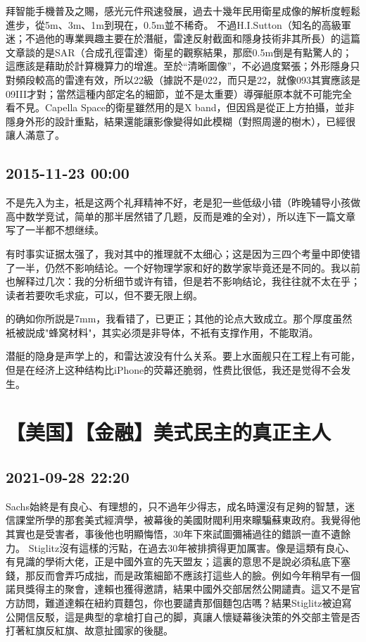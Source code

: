 \documentclass[twocolumn]{ctexart}
\begin{document}
拜智能手機普及之賜，感光元件飛速發展，過去十幾年民用衛星成像的解析度輕鬆進步，從5m、3m、1m到現在，0.5m並不稀奇。
不過H.I.Sutton（知名的高級軍迷；不過他的專業興趣主要在於潛艇，雷達反射截面和隱身技術非其所長）的這篇文章談的是SAR（合成孔徑雷達）衛星的觀察結果，那麽0.5m倒是有點驚人的；這應該是藉助於計算機算力的增進。至於“清晰圖像”，不必過度緊張；外形隱身只對頻段較高的雷達有效，所以22級（據説不是022，而只是22，就像093其實應該是09III才對；當然這種内部定名的細節，並不是太重要）導彈艇原本就不可能完全看不見。Capella Space的衛星雖然用的是X band，但因爲是從正上方拍攝，並非隱身外形的設計重點，結果還能讓影像變得如此模糊（對照周邊的樹木），已經很讓人滿意了。
\subsection*{2015-11-23 00:00}
不是先入为主，衹是这两个礼拜精神不好，老是犯一些低级小错（昨晚辅导小孩做高中数学竞试，简单的那半居然错了几题，反而是难的全对），所以连下一篇文章写了一半都不想继续。

有时事实证据太强了，我对其中的推理就不太细心；这是因为三四个考量中即使错了一半，仍然不影响结论。一个好物理学家和好的数学家毕竟还是不同的。我以前也解释过几次：我的分析细节或许有错，但是若不影响结论，我往往就不太在乎；读者若要吹毛求疵，可以，但不要无限上纲。

的确如你所説是7mm，我看错了，已更正；其他的论点大致成立。那个厚度虽然衹被説成"蜂窝材料"，其实必须是非导体，不衹有支撑作用，不能取消。

潜艇的隐身是声学上的，和雷达波没有什么关系。要上水面舰只在工程上有可能，但是在经济上这种结构比iPhone的荧幕还脆弱，性费比很低，我还是觉得不会发生。
\section*{【美国】【金融】美式民主的真正主人}
\subsection*{2021-09-28 22:20}

Sachs始終是有良心、有理想的，只不過年少得志，成名時還沒有足夠的智慧，迷信課堂所學的那套美式經濟學，被幕後的美國財閥利用來矇騙蘇東政府。我覺得他其實也是受害者，事後他也明顯悔悟，30年下來試圖彌補過往的錯誤一直不遺餘力。
Stiglitz沒有這樣的污點，在過去30年被排擠得更加厲害。像是這類有良心、有見識的學術大佬，正是中國外宣的先天盟友；這裏的意思不是說必須私底下塞錢，那反而會弄巧成拙，而是政策細節不應該打這些人的臉。例如今年稍早有一個諾貝獎得主的聚會，達賴也獲得邀請，結果中國外交部居然公開譴責。這又不是官方訪問，難道達賴在紐約買麵包，你也要譴責那個麵包店嗎？結果Stiglitz被迫寫公開信反駁，這是典型的拿槍打自己的脚，真讓人懷疑幕後決策的外交部主管是否打著紅旗反紅旗、故意扯國家的後腿。
\end{document}
